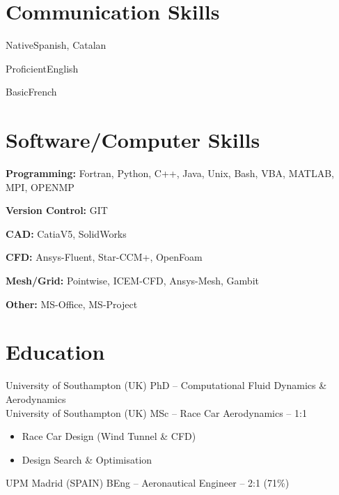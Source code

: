 \documentclass[fontsize=10pt]{tccv}
\begin{document}
\section{Communication Skills}
\begin{factlist}
\item{Native}{Spanish, Catalan}
\item{Proficient}{English}
\item{Basic}{French}
\end{factlist}

\vspace{-20pt}
\section{Software/Computer Skills}
\begin{factlist}
\item{\textbf{Programming:}}
     {Fortran, Python, C++, Java, Unix, Bash, VBA, MATLAB, MPI, OPENMP}
\item{\textbf{Version Control:}}
     {GIT}
\item{\textbf{CAD:}}
     {CatiaV5, SolidWorks}
\item{\textbf{CFD:}}
     {Ansys-Fluent, Star-CCM+, OpenFoam}
\item{\textbf{Mesh/Grid:}}
     {Pointwise, ICEM-CFD, Ansys-Mesh, Gambit}
\item{\textbf{Other:}}
     {MS-Office, MS-Project}
\end{factlist}


\vspace{-20pt}
\section{Education}
\begin{eventlist}
     	{University of Southampton (UK)}
     	{PhD -- \normalsize{Computational Fluid Dynamics \& Aerodynamics}} \\

     	{University of Southampton (UK)}
     	{MSc -- Race Car Aerodynamics -- 1:1} 
  	\begin{itemize}
	\itemsep -1pt
	   \item Race Car Design (Wind Tunnel \& CFD)
	   \item Design Search \& Optimisation
	\end{itemize}

	{UPM Madrid (SPAIN)}
	{BEng -- Aeronautical Engineer -- 2:1 (71\%)}
\end{eventlist}
\end{document}
